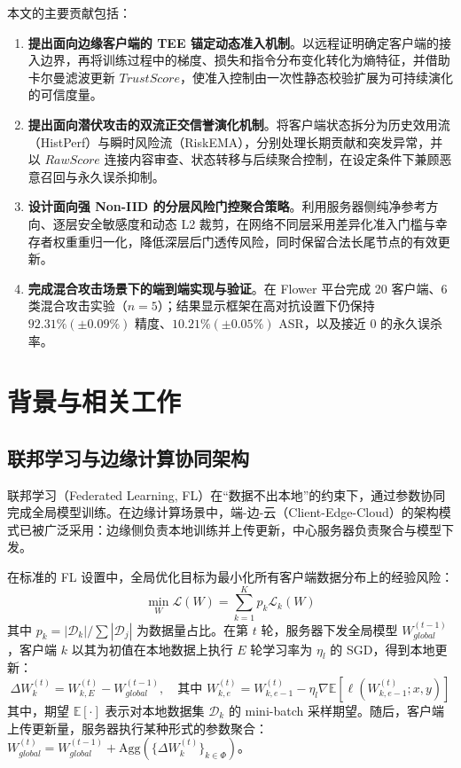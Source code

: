 \documentclass[11pt, a4paper, UTF8, fontset=fandol]{ctexart}
\begin{document}
本文的主要贡献包括：
\begin{enumerate}
    \item \textbf{提出面向边缘客户端的 TEE 锚定动态准入机制}。以远程证明确定客户端的接入边界，再将训练过程中的梯度、损失和指令分布变化转化为熵特征，并借助卡尔曼滤波更新 $TrustScore$，使准入控制由一次性静态校验扩展为可持续演化的可信度量。
    \item \textbf{提出面向潜伏攻击的双流正交信誉演化机制}。将客户端状态拆分为历史效用流（HistPerf）与瞬时风险流（RiskEMA），分别处理长期贡献和突发异常，并以 $RawScore$ 连接内容审查、状态转移与后续聚合控制，在设定条件下兼顾恶意召回与永久误杀抑制。
    \item \textbf{设计面向强 Non-IID 的分层风险门控聚合策略}。利用服务器侧纯净参考方向、逐层安全敏感度和动态 L2 裁剪，在网络不同层采用差异化准入门槛与幸存者权重重归一化，降低深层后门透传风险，同时保留合法长尾节点的有效更新。
    \item \textbf{完成混合攻击场景下的端到端实现与验证}。在 Flower 平台完成 20 客户端、6 类混合攻击实验（$n=5$）；结果显示框架在高对抗设置下仍保持 $92.31\% (\pm 0.09\%)$ 精度、$10.21\% (\pm 0.05\%)$ ASR，以及接近 0 的永久误杀率。
\end{enumerate}


\section{背景与相关工作}

\subsection{联邦学习与边缘计算协同架构}
联邦学习（Federated Learning, FL）在“数据不出本地”的约束下，通过参数协同完成全局模型训练。在边缘计算场景中，端-边-云（Client-Edge-Cloud）的架构模式已被广泛采用：边缘侧负责本地训练并上传更新，中心服务器负责聚合与模型下发。

在标准的 FL 设置中，全局优化目标为最小化所有客户端数据分布上的经验风险：
\begin{equation}
    \min_{W} \mathcal{L}(W) = \sum_{k=1}^K p_k \mathcal{L}_k(W)
\end{equation}
其中 $p_k = |\mathcal{D}_k| / \sum |\mathcal{D}_j|$ 为数据量占比。在第 $t$ 轮，服务器下发全局模型 $W_{global}^{(t-1)}$，客户端 $k$ 以其为初值在本地数据上执行 $E$ 轮学习率为 $\eta_l$ 的 SGD，得到本地更新：
\begin{equation}
    \Delta W_{k}^{(t)} = W_{k, E}^{(t)} - W_{global}^{(t-1)}, \quad \text{其中 } W_{k, e}^{(t)} = W_{k, e-1}^{(t)} - \eta_l \nabla \mathbb{E}[\ell(W_{k, e-1}^{(t)}; x, y)]
\end{equation}
其中，期望 $\mathbb{E}[\cdot]$ 表示对本地数据集 $\mathcal{D}_k$ 的 mini-batch 采样期望。随后，客户端上传更新量，服务器执行某种形式的参数聚合：$W_{global}^{(t)} = W_{global}^{(t-1)} + \mathrm{Agg}(\{ \Delta W_{k}^{(t)} \}_{k\in\Phi})$。
\end{document}
